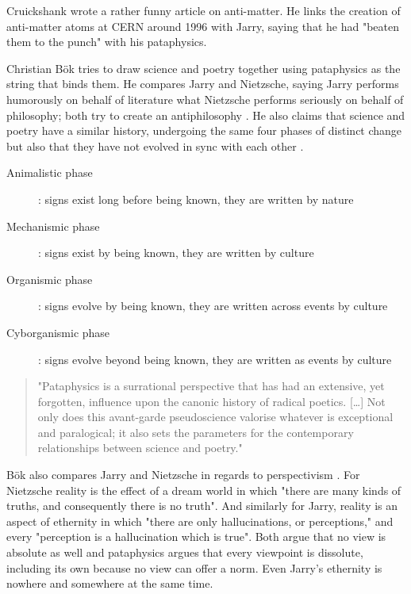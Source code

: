 Cruickshank \citep{Cruickshank} wrote a rather funny article on anti-matter. He links the creation of anti-matter atoms at CERN around 1996 with Jarry, saying that he had "beaten them to the punch" with his pataphysics.

Christian Bök \citep{Bok2002} tries to draw science and poetry together using pataphysics as the string that binds them. He compares Jarry and Nietzsche, saying Jarry performs humorously on behalf of literature what Nietzsche performs seriously on behalf of philosophy; both try to create an antiphilosophy \citep[p.9]{Bok2002}. He also claims that science and poetry have a similar history, undergoing the same four phases of distinct change but also that they have not evolved in sync with each other \citep[p.15]{Bok2002}.

\begin{description}
  \item [Animalistic phase]: signs exist long before being known, they are written by nature
  \item	[Mechanismic phase]: signs exist by being known, they are written by culture
  \item [Organismic phase]: signs evolve by being known, they are written across events by culture
  \item	[Cyborganismic phase]: signs evolve beyond being known, they are written as events by culture
\end{description}

\begin{quote}
  "Pataphysics is a surrational perspective that has had an extensive, yet forgotten, influence upon the canonic history of radical poetics. […] Not only does this avant-garde pseudoscience valorise whatever is exceptional and paralogical; it also sets the parameters for the contemporary relationships between science and poetry." \citep[p.27]{Bok2002}
\end{quote}

Bök also compares Jarry and Nietzsche in regards to perspectivism \citep[p.31]{Bok2002}. For Nietzsche reality is the effect of a dream world in which "there are many kinds of truths, and consequently there is no truth". And similarly for Jarry, reality is an aspect of ethernity in which "there are only hallucinations, or perceptions," and every "perception is a hallucination which is true". Both argue that no view is absolute as well and pataphysics argues that every viewpoint is dissolute, including its own because no view can offer a norm. Even Jarry's ethernity is nowhere and somewhere at the same time.

